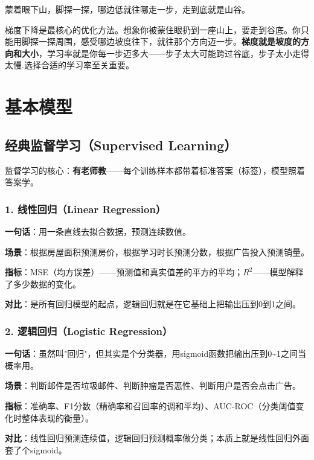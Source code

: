 \documentclass[12pt,a4paper]{ctexart}
\begin{document}
\begin{funbox}[一句话解释]
蒙着眼下山，脚探一探，哪边低就往哪走一步，走到底就是山谷。
\end{funbox}

梯度下降是最核心的优化方法。想象你被蒙住眼扔到一座山上，要走到谷底。你只能用脚探一探周围，感受哪边坡度往下，就往那个方向迈一步。\textbf{梯度就是坡度的方向和大小}，学习率就是你每一步迈多大——步子太大可能跨过谷底，步子太小走得太慢.选择合适的学习率至关重要。

\newpage

\section{基本模型}

\subsection{经典监督学习（Supervised Learning）}

监督学习的核心：\textbf{有老师教}——每个训练样本都带着标准答案（标签），模型照着答案学。

\subsubsection{1. 线性回归（Linear Regression）}

\begin{funbox}
\textbf{一句话}：用一条直线去拟合数据，预测连续数值。

\textbf{场景}：根据房屋面积预测房价，根据学习时长预测分数，根据广告投入预测销量。

\textbf{指标}：MSE（均方误差）——预测值和真实值差的平方的平均；$R^2$——模型解释了多少数据的变化。

\textbf{对比}：是所有回归模型的起点，逻辑回归就是在它基础上把输出压到0到1之间。
\end{funbox}

\subsubsection{2. 逻辑回归（Logistic Regression）}

\begin{funbox}
\textbf{一句话}：虽然叫"回归"，但其实是个分类器，用sigmoid函数把输出压到0\textasciitilde1之间当概率用。

\textbf{场景}：判断邮件是否垃圾邮件、判断肿瘤是否恶性、判断用户是否会点击广告。

\textbf{指标}：准确率、F1分数（精确率和召回率的调和平均）、AUC-ROC（分类阈值变化时整体表现的衡量）。

\textbf{对比}：线性回归预测连续值，逻辑回归预测概率做分类；本质上就是线性回归外面套了个sigmoid。
\end{funbox}
\end{document}
